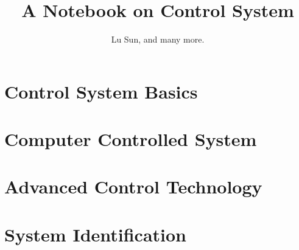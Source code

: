 

\makeindex



\frontmatter

\title{A Notebook on Control System}
\author{Lu Sun, and many more.}

\maketitle


\tableofcontents


\listoffigures
\listoftables

\mainmatter

\part{Control System Basics}







\part{Computer Controlled System}





\part{Advanced Control Technology}









\part{System Identification}





